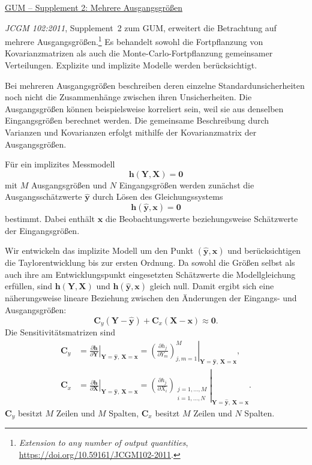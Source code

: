 \underline{GUM -- Supplement 2: Mehrere Ausgangsgrößen}

\textsl{JCGM 102:2011}, Supplement~2 zum GUM, erweitert die Betrachtung auf
mehrere Ausgangsgrößen.\footnote{\textsl{Extension to any number of output
quantities}, \url{https://doi.org/10.59161/JCGM102-2011}.}
Es behandelt sowohl die Fortpflanzung von Kovarianzmatrizen als auch die
Monte-Carlo-Fortpflanzung gemeinsamer Verteilungen. Explizite und implizite
Modelle werden berücksichtigt.

Bei mehreren Ausgangsgrößen beschreiben deren einzelne
Standardunsicherheiten noch nicht die Zusammenhänge zwischen ihren
Unsicherheiten. Die Ausgangsgrößen können beispielsweise korreliert
sein, weil sie aus denselben Eingangsgrößen berechnet werden.
Die gemeinsame Beschreibung durch Varianzen und Kovarianzen erfolgt
mithilfe der Kovarianzmatrix der Ausgangsgrößen.

Für ein implizites Messmodell
\begin{equation}
\mathbf h(\mathbf Y,\mathbf X)=\mathbf 0
\end{equation}
mit $M$ Ausgangsgrößen und $N$ Eingangsgrößen werden zunächst die
Ausgangsschätzwerte $\hat{\mathbf y}$ durch Lösen des Gleichungssystems
\begin{equation}
\mathbf h(\hat{\mathbf y},\mathbf x)=\mathbf 0
\end{equation}
bestimmt. Dabei enthält $\mathbf x$ die Beobachtungswerte
beziehungsweise Schätzwerte der Eingangsgrößen.

Wir entwickeln das implizite Modell um den Punkt
$(\hat{\mathbf y},\mathbf x)$ und berücksichtigen die Taylorentwicklung
bis zur ersten Ordnung. Da sowohl die Größen selbst als auch ihre
am Entwicklungspunkt eingesetzten Schätzwerte die Modellgleichung
erfüllen, sind $\mathbf h(\mathbf Y,\mathbf X)$ und
$\mathbf h(\hat{\mathbf y},\mathbf x)$ gleich null. Damit ergibt sich
eine näherungsweise lineare Beziehung zwischen den Änderungen
der Eingangs- und Ausgangsgrößen:
\begin{equation}
\mathbf C_y(\mathbf Y-\hat{\mathbf y})
+
\mathbf C_x(\mathbf X-\mathbf x)
\approx \mathbf 0.
\end{equation}
Die Sensitivitätsmatrizen sind
\begin{equation}
\begin{aligned}
\mathbf C_y
&=
\left.
\frac{\partial \mathbf h}{\partial \mathbf Y}
\right|_{\mathbf Y=\hat{\mathbf y},\,\mathbf X=\mathbf x}
=
\left.
\left(\frac{\partial h_j}{\partial Y_m}\right)_
{j,m=1}^{M}
\right|_{\mathbf Y=\hat{\mathbf y},\,\mathbf X=\mathbf x},
\\[1ex]
\mathbf C_x
&=
\left.
\frac{\partial \mathbf h}{\partial \mathbf X}
\right|_{\mathbf Y=\hat{\mathbf y},\,\mathbf X=\mathbf x}
=
\left.
\left(\frac{\partial h_j}{\partial X_i}\right)_
{\substack{j=1,\dots,M\\i=1,\dots,N}}
\right|_{\mathbf Y=\hat{\mathbf y},\,\mathbf X=\mathbf x}.
\end{aligned}
\end{equation}
$\mathbf C_y$ besitzt $M$ Zeilen und $M$ Spalten,
$\mathbf C_x$ besitzt $M$ Zeilen und $N$ Spalten.

